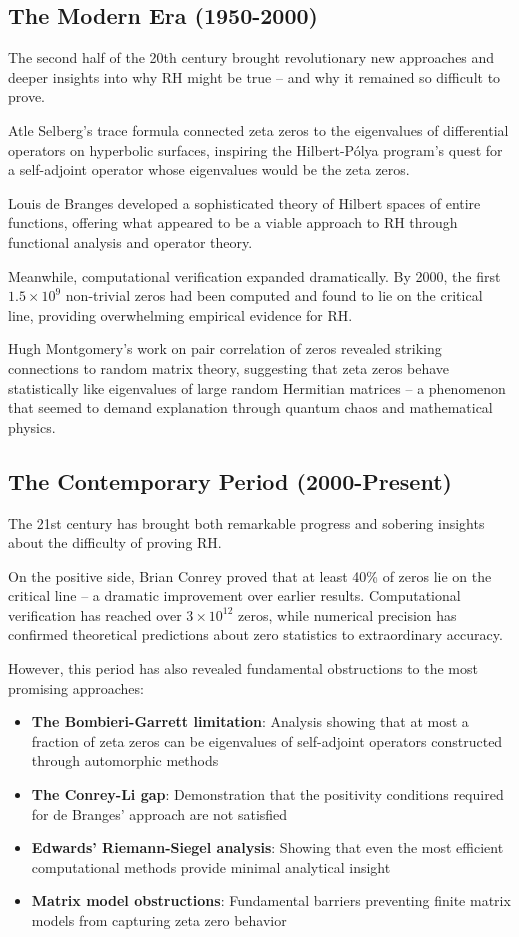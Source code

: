 \subsection*{The Modern Era (1950-2000)}

The second half of the 20th century brought revolutionary new approaches and deeper insights into why RH might be true -- and why it remained so difficult to prove.

Atle Selberg's trace formula connected zeta zeros to the eigenvalues of differential operators on hyperbolic surfaces, inspiring the Hilbert-P\'olya program's quest for a self-adjoint operator whose eigenvalues would be the zeta zeros.

Louis de Branges developed a sophisticated theory of Hilbert spaces of entire functions, offering what appeared to be a viable approach to RH through functional analysis and operator theory.

Meanwhile, computational verification expanded dramatically. By 2000, the first $1.5 \times 10^9$ non-trivial zeros had been computed and found to lie on the critical line, providing overwhelming empirical evidence for RH.

Hugh Montgomery's work on pair correlation of zeros revealed striking connections to random matrix theory, suggesting that zeta zeros behave statistically like eigenvalues of large random Hermitian matrices -- a phenomenon that seemed to demand explanation through quantum chaos and mathematical physics.

\subsection*{The Contemporary Period (2000-Present)}

The 21st century has brought both remarkable progress and sobering insights about the difficulty of proving RH.

On the positive side, Brian Conrey proved that at least 40\% of zeros lie on the critical line -- a dramatic improvement over earlier results. Computational verification has reached over $3 \times 10^{12}$ zeros, while numerical precision has confirmed theoretical predictions about zero statistics to extraordinary accuracy.

However, this period has also revealed fundamental obstructions to the most promising approaches:

\begin{itemize}
\item \textbf{The Bombieri-Garrett limitation}: Analysis showing that at most a fraction of zeta zeros can be eigenvalues of self-adjoint operators constructed through automorphic methods
\item \textbf{The Conrey-Li gap}: Demonstration that the positivity conditions required for de Branges' approach are not satisfied
\item \textbf{Edwards' Riemann-Siegel analysis}: Showing that even the most efficient computational methods provide minimal analytical insight
\item \textbf{Matrix model obstructions}: Fundamental barriers preventing finite matrix models from capturing zeta zero behavior
\end{itemize}

